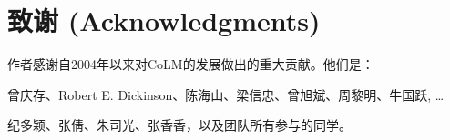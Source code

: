 \chapter *{致谢 (Acknowledgments)}

作者感谢自2004年以来对CoLM的发展做出的重大贡献。他们是：

曾庆存、Robert E. Dickinson、陈海山、梁信忠、曾旭斌、周黎明、牛国跃, …

纪多颖、张倩、朱司光、张香香，以及团队所有参与的同学。